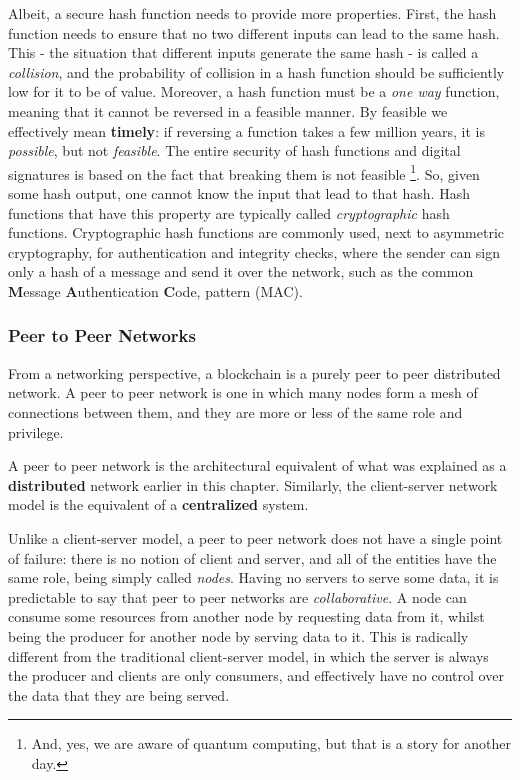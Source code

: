 Albeit, a secure hash function needs to provide more properties. First, the hash function needs to
ensure that no two different inputs can lead to the same hash. This - the situation that different inputs generate the same hash - is called a \textit{collision}, and the probability of collision in a hash function should be sufficiently low for it to be of
value. Moreover, a hash function must be a \textit{one way} function, meaning that it cannot be
reversed in a feasible manner. By feasible we effectively mean \textbf{timely}: if reversing a function takes a few million years, it is \textit{possible}, but not \textit{feasible}. The entire security of hash
functions and digital signatures is based on the fact that breaking them is not feasible
\footnote{And, yes, we are aware of quantum computing, but that is a story for another day.}. So,
given some hash output, one cannot know the input that lead to that hash. Hash functions that have
this property are typically called \textit{cryptographic} hash functions. Cryptographic hash
functions are commonly used, next to asymmetric cryptography, for authentication and integrity
checks, where the sender can sign only a hash of a message and send it over the network, such as the
common \textbf{M}essage \textbf{A}uthentication \textbf{C}ode, pattern
\cite{bellareKeyingHashFunctions1996} (MAC).

\subsubsection{Peer to Peer Networks} \label{chap_bg:subsec:p2p}

From a networking perspective, a blockchain is a purely peer to peer distributed network. A peer to
peer network is one in which many nodes form a mesh of connections between them, and they are more
or less of the same role and privilege.

\begin{remark}
	A peer to peer network is the architectural equivalent of what was explained as a
	\textbf{distributed} network earlier in this chapter. Similarly, the client-server network model
	is the equivalent of a \textbf{centralized} system.
\end{remark}

Unlike a client-server model, a peer to peer network does not have a single point of failure: there
is no notion of client and server, and all of the entities have the same role, being simply called
\textit{nodes}. Having no servers to serve some data, it is predictable to say that peer to peer
networks are \textit{collaborative}. A node can consume some resources from another node by
requesting data from it, whilst being the producer for another node by serving data to it.
This is radically different from the traditional client-server model, in which the server is always the producer and clients are only consumers, and effectively have no control over the data that they are being
served.

